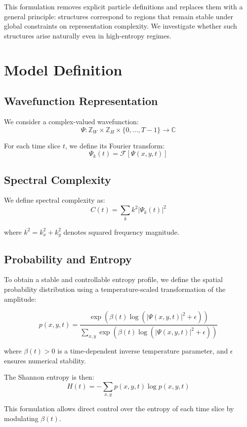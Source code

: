 \documentclass[11pt]{article}
\begin{document}
This formulation removes explicit particle definitions and replaces them with a general principle: structures correspond to regions that remain stable under global constraints on representation complexity. We investigate whether such structures arise naturally even in high-entropy regimes.


\section{Model Definition}

\subsection{Wavefunction Representation}

We consider a complex-valued wavefunction:
\[
\Psi : \mathbb{Z}_W \times \mathbb{Z}_H \times \{0, \dots, T-1\} \to \mathbb{C}
\]

For each time slice $t$, we define its Fourier transform:
\[
\Psi_k(t) = \mathcal{F}[\Psi(x,y,t)]
\]

\subsection{Spectral Complexity}

We define spectral complexity as:
\[
C(t) = \sum_k k^2 |\Psi_k(t)|^2
\]

where $k^2 = k_x^2 + k_y^2$ denotes squared frequency magnitude.

\subsection{Probability and Entropy}

To obtain a stable and controllable entropy profile, we define the spatial probability distribution using a temperature-scaled transformation of the amplitude:

\[
p(x,y,t) = \frac{\exp\left(\beta(t) \log(|\Psi(x,y,t)|^2 + \epsilon)\right)}{\sum_{x,y} \exp\left(\beta(t) \log(|\Psi(x,y,t)|^2 + \epsilon)\right)}
\]

where $\beta(t) > 0$ is a time-dependent inverse temperature parameter, and $\epsilon$ ensures numerical stability.

The Shannon entropy is then:
\[
H(t) = -\sum_{x,y} p(x,y,t)\log p(x,y,t)
\]

This formulation allows direct control over the entropy of each time slice by modulating $\beta(t)$.
\end{document}
